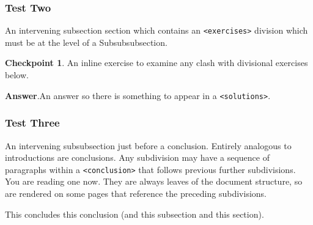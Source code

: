 \documentclass{amsart}
\theoremstyle{plain}%
\theoremstyle{definition}%
\newtheorem{inlineexercise}[theorem]{Checkpoint}
\theoremstyle{remark}%
\newcommand{\blocktitlefont}{\relax}
\newcommand{\mono}[1]{\texttt{#1}}
\numberwithin{equation}{section}
\begin{document}
\subsubsection{Test Two}\label{subsection-intro-conclude-4}%
An intervening subsection section which contains an \mono{<exercises>} division which must be at the level of a Subsubsubsection.%
\begin{inlineexercise}\label{subsection-intro-conclude-4-3}%
%
An inline exercise to examine any clash with divisional exercises below.%
\par\smallskip%
\noindent\textbf{\blocktitlefont Answer}.\hypertarget{subsection-intro-conclude-4-3-2}{}\quad{}An answer so there is something to appear in a \mono{<solutions>}.%
\end{inlineexercise}%
%
%
\typeout{************************************************}
\typeout{************************************************}
%
\subsubsection{Test Three}\label{subsection-intro-conclude-5}%
An intervening subsubsection just before a conclusion.%
Entirely analogous to introductions are conclusions.  Any subdivision may have a sequence of paragraphs within a \mono{<conclusion>} that follows previous further subdivisions.  You are reading one now.  They are always leaves of the document structure, so are rendered on some pages that reference the preceding subdivisions.%
\par
This concludes this conclusion (and this subsection and this section).%
%
%
\typeout{************************************************}
\typeout{************************************************}
%
\end{document}
